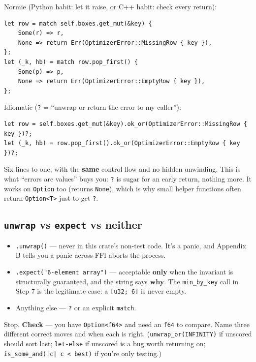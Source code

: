 \documentclass[11pt]{article}
\begin{document}
Normie (Python habit: let it raise, or C++ habit: check every return):

\begin{verbatim}
let row = match self.boxes.get_mut(&key) {
    Some(r) => r,
    None => return Err(OptimizerError::MissingRow { key }),
};
let (_k, hb) = match row.pop_first() {
    Some(p) => p,
    None => return Err(OptimizerError::EmptyRow { key }),
};
\end{verbatim}

Idiomatic (\texttt{?} = ``unwrap or return the error to my caller''):

\begin{verbatim}
let row = self.boxes.get_mut(&key).ok_or(OptimizerError::MissingRow { key })?;
let (_k, hb) = row.pop_first().ok_or(OptimizerError::EmptyRow { key })?;
\end{verbatim}

Six lines to one, with the \textbf{same} control flow and no hidden unwinding. This is
what ``errors are values'' buys you: \texttt{?} is sugar for an early return, nothing
more. It works on \texttt{Option} too (returns \texttt{None}), which is why small helper
functions often return \texttt{Option<T>} just to get \texttt{?}.
\subsection{\texttt{unwrap} vs \texttt{expect} vs neither}
\label{sec:org6bac710}

\begin{itemize}
\item \texttt{.unwrap()} — never in this crate's non-test code. It's a panic, and
Appendix B tells you a panic across FFI aborts the process.
\item \texttt{.expect("6-element array")} — acceptable \textbf{\textbf{only}} when the invariant is
structurally guaranteed, and the string says \textbf{why}. The \texttt{min\_by\_key} call in
Step 7 is the legitimate case: a \texttt{[u32; 6]} is never empty.
\item Anything else — \texttt{?} or an explicit \texttt{match}.
\end{itemize}

Stop. \textbf{\textbf{Check}} — you have \texttt{Option<f64>} and need an \texttt{f64} to compare. Name
three different correct moves and when each is right. (\texttt{unwrap\_or(INFINITY)} if
unscored should sort last; \texttt{let-else} if unscored is a bug worth returning on;
\texttt{is\_some\_and(|c| c < best)} if you're only testing.)
\end{document}
